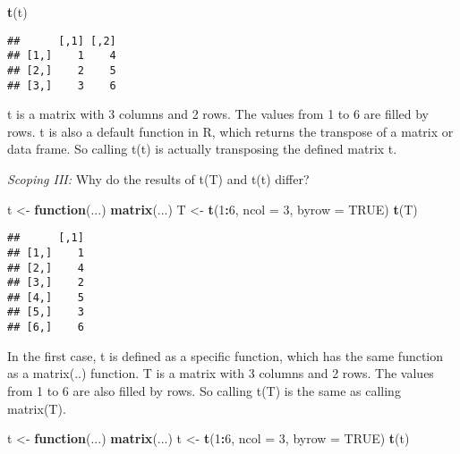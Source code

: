 \documentclass[12,]{article}
\newenvironment{Shaded}{\begin{snugshade}}{\end{snugshade}}
\newcommand{\KeywordTok}[1]{\textcolor[rgb]{0.13,0.29,0.53}{\textbf{#1}}}
\newcommand{\DataTypeTok}[1]{\textcolor[rgb]{0.13,0.29,0.53}{#1}}
\newcommand{\DecValTok}[1]{\textcolor[rgb]{0.00,0.00,0.81}{#1}}
\newcommand{\StringTok}[1]{\textcolor[rgb]{0.31,0.60,0.02}{#1}}
\newcommand{\OtherTok}[1]{\textcolor[rgb]{0.56,0.35,0.01}{#1}}
\newcommand{\ControlFlowTok}[1]{\textcolor[rgb]{0.13,0.29,0.53}{\textbf{#1}}}
\newcommand{\OperatorTok}[1]{\textcolor[rgb]{0.81,0.36,0.00}{\textbf{#1}}}
\newcommand{\NormalTok}[1]{#1}
\begin{document}
\begin{Shaded}
\begin{Highlighting}[]
\KeywordTok{t}\NormalTok{(t)}
\end{Highlighting}
\end{Shaded}

\begin{verbatim}
##      [,1] [,2]
## [1,]    1    4
## [2,]    2    5
## [3,]    3    6
\end{verbatim}

t is a matrix with 3 columns and 2 rows. The values from 1 to 6 are
filled by rows. t is also a default function in R, which returns the
transpose of a matrix or data frame. So calling t(t) is actually
transposing the defined matrix t.

\emph{Scoping III:} Why do the results of t(T) and t(t) differ?

\begin{Shaded}
\begin{Highlighting}[]
\NormalTok{t <-}\StringTok{ }\ControlFlowTok{function}\NormalTok{(...) }\KeywordTok{matrix}\NormalTok{(...)}
\NormalTok{T <-}\StringTok{ }\KeywordTok{t}\NormalTok{(}\DecValTok{1}\OperatorTok{:}\DecValTok{6}\NormalTok{, }\DataTypeTok{ncol =} \DecValTok{3}\NormalTok{, }\DataTypeTok{byrow =} \OtherTok{TRUE}\NormalTok{)}
\KeywordTok{t}\NormalTok{(T)}
\end{Highlighting}
\end{Shaded}

\begin{verbatim}
##      [,1]
## [1,]    1
## [2,]    4
## [3,]    2
## [4,]    5
## [5,]    3
## [6,]    6
\end{verbatim}

In the first case, t is defined as a specific function, which has the
same function as a matrix(..) function. T is a matrix with 3 columns and
2 rows. The values from 1 to 6 are also filled by rows. So calling t(T)
is the same as calling matrix(T).

\begin{Shaded}
\begin{Highlighting}[]
\NormalTok{t <-}\StringTok{ }\ControlFlowTok{function}\NormalTok{(...) }\KeywordTok{matrix}\NormalTok{(...)}
\NormalTok{t <-}\StringTok{ }\KeywordTok{t}\NormalTok{(}\DecValTok{1}\OperatorTok{:}\DecValTok{6}\NormalTok{, }\DataTypeTok{ncol =} \DecValTok{3}\NormalTok{, }\DataTypeTok{byrow =} \OtherTok{TRUE}\NormalTok{) }
\KeywordTok{t}\NormalTok{(t)}
\end{Highlighting}
\end{Shaded}
\end{document}
